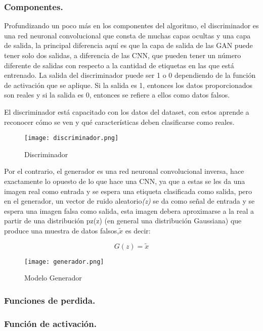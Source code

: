 \subsubsection{Componentes.}

Profundizando un poco más en los componentes del algoritmo, el discriminador es una red neuronal convolucional que consta de muchas 
capas ocultas y una capa de salida, la principal diferencia aquí es que la capa de salida de las GAN puede tener solo dos salidas, 
a diferencia de las CNN, que pueden tener un número diferente de salidas con respecto a la cantidad de etiquetas en las que está entrenado.
La salida del discriminador puede ser 1 o 0 dependiendo de la función de activación que se aplique. Si la salida es 1, 
entonces los datos proporcionados son reales y si la salida es 0, entonces se refiere a ellos como datos falsos.

El discriminador está capacitado con los datos del dataset, con estos aprende a reconocer cómo se ven y qué características deben 
clasificarse como reales.




\begin{figure}[H]
    \begin{center}
      \texttt{[image: discriminador.png]}
      \caption{Discriminador}
      \label{Alexis2}
    \end{center}
\end{figure}


Por el contrario, el generador es una red neuronal convolucional inversa, hace exactamente lo opuesto de lo que hace una CNN, ya que 
a estas se les da una imagen real como entrada y se espera una etiqueta clasificada como salida, 
pero en el generador, un vector de ruido aleatorio\emph{(z)} se da como señal de entrada 
y se espera una imagen falsa como salida, esta imagen debera aproximarse a la real a
partir de una distribución pz(z) (en general una distribución Gaussiana) que
produce una muestra de datos falsos,$\tilde{x}$ es decir:

\begin{equation}
G(z) = \tilde{x}
\end{equation}

\begin{figure}[H]
    \begin{center}
      \texttt{[image: generador.png]}
      \caption{Modelo Generador}
      \label{Alexis3}
    \end{center}
\end{figure}
    
    \subsubsection{Funciones de perdida.}






    
    \subsubsection{Función de activación.}



